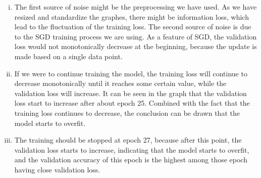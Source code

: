 \documentclass[11pt, answers]{exam}
\begin{document}
\begin{solution}
\begin{parts}
    \begin{enumerate}[i.]
      \item The first source of noise might be the preprocessing we have used. As we have resized and standardize the graphes, there might be information loss, which lead to the fluctuation of the training loss. The second source of noise is due to the SGD training process we are using. As a feature of SGD, the validation loss would not monotonically decrease at the beginning, because the update is made based on a single data point. 

      \item If we were to continue training the model, the training loss will continue to decrease monotonically until it reaches some certain value,  while the validation loss will increase. It can be seen in the graph that the validation loss start to increase after about epoch 25. Combined with the fact that the training loss continues to decrease, the conclusion can be drawn that the model starts to overfit.

      \item The training should be stopped at epoch 27, because after this point, the validation loss starts to increase, indicating that the model starts to overfit, and the validation accuracy of this epoch is the highest among those epoch having close validation loss.
    \end{enumerate}


\end{parts}
\end{solution}
\end{document}
